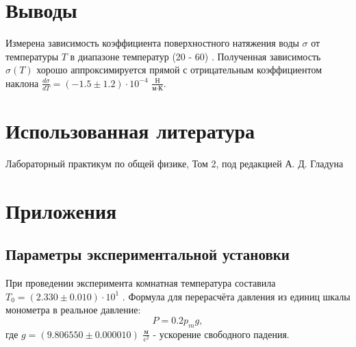 \documentclass[12pt]{article}
\begin{document}
\section{Выводы}
Измерена зависимость коэффициента поверхностного натяжения воды $\sigma$ от температуры $T$ в диапазоне 
температур (20 - 60) \textcelsius. Полученная зависимость $\sigma(T)$ хорошо аппроксимируется прямой 
с отрицательным коэффициентом наклона $\frac{d \sigma }{d T} = (-1.5 \pm 1.2) \cdot 10 ^ {-4}$ $\frac{\text{Н}}{\text{м}\cdot\text{К}}$.    

\section{Использованная литература}
\begin{thebibliography}{9}
    Лабораторный практикум по общей физике, Том 2, под редакцией А. Д. Гладуна
\end{thebibliography}

\section{Приложения}
\subsection{Параметры экспериментальной установки} \label{app_1}
При проведении эксперимента комнатная температура составила $T_0 = (2.330 \pm 0.010) \cdot 10 ^ {1}$ \textcelsius. 
Формула для перерасчёта давления из единиц шкалы монометра в реальное давление:
\[
    P = 0.2 p_m g,
\]
где $g = (9.806550 \pm 0.000010)$ $\frac{\text{м}}{\text{c}^2}$  - ускорение свободного падения. 
\end{document}
